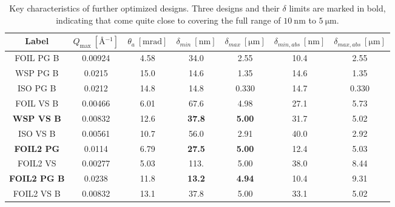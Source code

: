 \begin{table}[h!]
	\centering
	\begin{tabular}{c | c c c c | cc}
		\toprule
		Label & $Q_{\text{max}} ~[\unit{\angstrom^{-1}}]$ & $\theta_a~[\unit{\milli\radian}]$ & $\delta_{min}~[\unit{\nano\meter}]$ & $\delta_{max}~[\unit{\micro\meter}]$ & $\delta_{min,abs}~[\unit{\nano\meter}]$ & $\delta_{max,abs}~[\unit{\micro\meter}]$ \\
		\midrule
		FOIL PG B & \num{0.00924} & \num{4.58} & \num{34.0} & \num{2.55} & \num{10.4} & \num{2.55} \\
		WSP PG B & \num{0.0215} & \num{15.0} & \num{14.6} & \num{1.35} & \num{14.6} & \num{1.35} \\
		ISO PG B & \num{0.0212} & \num{14.8} & \num{14.8} & \num{0.330} & \num{14.7} & \num{0.330} \\
		FOIL VS B & \num{0.00466} & \num{6.01} & \num{67.6} & \num{4.98} & \num{27.1} & \num{5.73} \\
		\textbf{WSP VS B} & \num{0.00832} & \num{12.6} & \textbf{37.8} & \textbf{5.00} & \num{31.7} & \num{5.02} \\
		ISO VS B & \num{0.00561} & \num{10.7} & \num{56.0} & \num{2.91} & \num{40.0} & \num{2.92} \\
		\midrule
		\textbf{FOIL2 PG} & \num{0.0114} & \num{6.79} & \textbf{27.5} & \textbf{5.00} & \num{12.4} & \num{5.03} \\
		FOIL2 VS & \num{0.00277} & \num{5.03} & \num{113.} & \num{5.00} & \num{38.0} & \num{8.44} \\
		\textbf{FOIL2 PG B} & \num{0.0238} & \num{11.8} & \textbf{13.2} & \textbf{4.94} & \num{10.4} & \num{9.31} \\
		FOIL2 VS B & \num{0.00832} & \num{13.1} & \num{37.8} & \num{5.00} & \num{33.1} & \num{5.02} \\
		\bottomrule
	\end{tabular}
	\caption{Key characteristics of further optimized designs. Three designs and their $\delta$ limits are marked in bold, indicating that come quite close to covering the full range of $\SI{10}{\nano\meter}$ to $\SI{5}{\micro\meter}$.}
	\label{tab:optimized-designs-performance-detector-boost}
\end{table}


